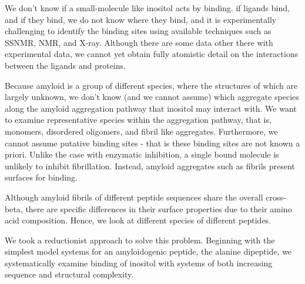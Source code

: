 


We don't know if a small-molecule like inositol acts by binding. if ligands bind, and if they bind, we do not know where they bind, and it is experimentally challenging to identify the binding sites using available techniques such as SSNMR, NMR, and X-ray. Although there are some data other there with experimental data, we cannot yet obtain fully atomistic detail on the interactions between the ligands and proteins.

Because amyloid is a group of different species, where the structures of which are largely unknown, we don't know (and we cannot assume) which aggregate species along the amyloid aggregation pathway that inositol may interact with. We want to examine representative species within the aggregation pathway, that is, monomers, disordered oligomers, and fibril like aggregates. Furthermore, we cannot assume putative binding sites - that is these binding sites are not known a priori. Unlike the case with enzymatic inhibition, a single bound molecule is unlikely to inhibit fibrillation. Instead, amyloid aggregates such as fibrils present surfaces for binding.

Although amyloid fibrils of different peptide sequences share the overall cross-beta, there are specific differences in their surface properties due to their amino acid composition. Hence, we look at different species of different peptides.

We took a reductionist approach to solve this problem. Beginning with the simplest model systems for an amyloidogenic peptide, the alanine dipeptide, we systematically examine binding of inositol with systems of both increasing sequence and structural complexity.

